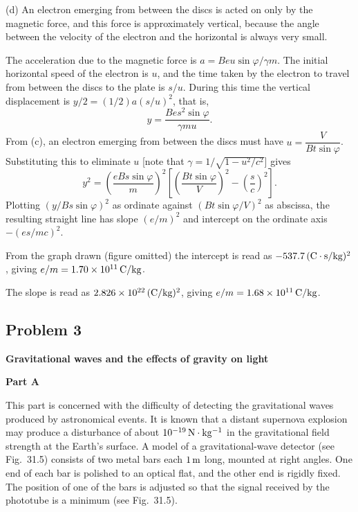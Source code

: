 (d) An electron emerging from between the discs is acted on only by the magnetic force, and this force is approximately vertical, because the angle between the velocity of the electron and the horizontal is always very small.

The acceleration due to the magnetic force is $a=Beu\sin\varphi/\gamma m$. The initial horizontal speed of the electron is $u$, and the time taken by the electron to travel from between the discs to the plate is $s/u$. During this time the vertical displacement is $y/2=(1/2)a(s/u)^2$, that is,
\begin{equation*}
y=\frac{Bes^2\sin\varphi}{\gamma mu} .
\end{equation*}
From (c), an electron emerging from between the discs must have $u=\dfrac{V}{Bt\sin\varphi}$. Substituting this to eliminate $u$ [note that $\gamma=1/\sqrt{1-u^2/c^2}$] gives
\begin{equation*}
y^2=\left(\frac{eBs\sin\varphi}{m}\right)^2
\left[\left(\frac{Bt\sin\varphi}{V}\right)^2-\left(\frac{s}{c}\right)^2\right].
\end{equation*}
Plotting $(y/Bs\sin\varphi)^2$ as ordinate against $(Bt\sin\varphi/V)^2$ as abscissa, the resulting straight line has slope $(e/m)^2$ and intercept on the ordinate axis $-(es/mc)^2$.

From the graph drawn (figure omitted) the intercept is read as $-537.7\,\mathrm{(C\cdot s/kg)^2}$, giving $e/m=1.70\times10^{11}\,\mathrm{C/kg}$.

The slope is read as $2.826\times10^{22}\,\mathrm{(C/kg)^2}$, giving $e/m=1.68\times10^{11}\,\mathrm{C/kg}$.

\subsection*{Problem 3}

\textbf{Gravitational waves and the effects of gravity on light}

\textbf{Part A}

This part is concerned with the difficulty of detecting the gravitational waves produced by astronomical events. It is known that a distant supernova explosion may produce a disturbance of about $10^{-19}\,\mathrm{N\cdot kg^{-1}}$ in the gravitational field strength at the Earth's surface. A model of a gravitational-wave detector (see Fig.~31.5) consists of two metal bars each $1\,\mathrm{m}$ long, mounted at right angles. One end of each bar is polished to an optical flat, and the other end is rigidly fixed. The position of one of the bars is adjusted so that the signal received by the phototube is a minimum (see Fig.~31.5).

